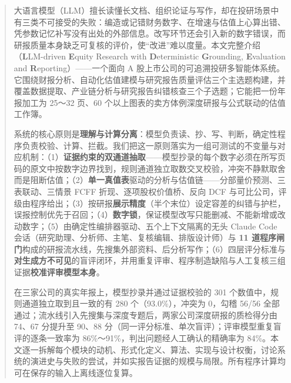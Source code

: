 \begin{abstract}
大语言模型（LLM）擅长读懂长文档、组织论证与写作，却在投研场景中有三类不可接受的失败：编造或记错财务数字、在增速与估值上心算出错、凭参数记忆补写没有出处的外部信息。改写环节还会引入新的数字错误，而研报质量本身缺乏可复核的评价，使“改进”难以度量。本文完整介绍 \sysname{}（\textbf{L}LM-driven \textbf{E}quity Research with \textbf{D}eterministic \textbf{G}rounding, \textbf{E}valuation and \textbf{R}eporting）——一个面向 A 股上市公司的可追溯投研多智能体系统。它围绕财报分析、自动化估值建模与研究报告质量评估三个主选题构建，并覆盖数据提取、产业链分析与研究报告纠错核查三个子选题；它能把一份年报加工为 25～32 页、60 个以上图表的卖方体例深度研报与公式联动的估值工作簿。

系统的核心原则是\textbf{理解与计算分离}：模型负责读、抄、写、判断，确定性程序负责校验、计算、拦截。我们把这一原则落实为一组可测试的不变量与对应机制：（1）\textbf{证据约束的双通道抽取}——模型抄录的每个数字必须在所写页码的原文中按数字边界找到，规则通道独立取数交叉校验，冲突不静默取舍而是阻断估值；（2）\textbf{单一真值表}驱动的分析与估值链——分部量价预测、三表联动、三情景 FCFF 折现、逐项股权价值桥、反向 DCF 与可比公司，评级由程序给出；（3）按研报\textbf{展示精度}（半个末位）设定容差的纠错与护栏，误报控制优先于召回；（4）\textbf{数字锁}，保证模型改写只能删减、不能新增或改动数字；（5）由确定性编排器驱动、五个上下文隔离的无头 Claude Code 会话（研究助理、分析师、主笔、复核编辑、排版设计师）与 \textbf{11 道程序闸门}构成的研报流水线，先搜集外部资料、后分析写作；（6）四层评分标准与\textbf{对生成方不可见}的盲评闭环，并用重复评审、程序制造缺陷与人工复核三组证据\textbf{校准评审模型本身}。

在三家公司的真实年报上，模型抄录并通过证据校验的 301 个数值中，规则通道独立取到且一致的有 280 个（93.0\%），冲突为 0，勾稽 56/56 全部通过；流水线引入先搜集与深度专题后，两家公司深度研报的质检得分由 74、67 分提升至 90、88 分（同一评分标准、单次盲评）；评审模型重复盲评的逐条一致率为 86\%～91\%，判出问题经人工确认的精确率为 84\%。本文逐一拆解每个模块的动机、形式化定义、算法、实现与设计权衡，讨论系统的演进史与失败的尝试，并如实报告证据的规模与局限。所有程序计算均可在保存的输入上离线逐位复算。
\end{abstract}
